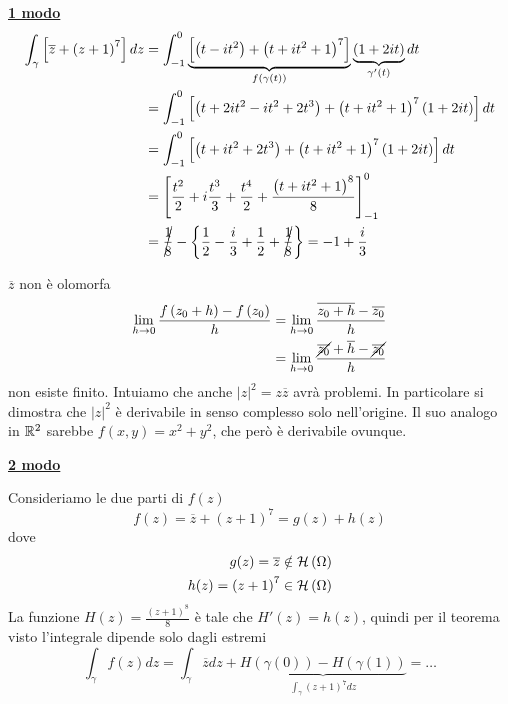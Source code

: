 \textbf{\underline{1 modo}}
\begin{align*}
\int\nolimits_{\gamma}\left[\overline{z} + \left(z + 1\right)^{7}\right] dz & = \int\nolimits^{0}_{- 1}\underbrace{\left[\left(t - it^{2}\right) + \left(t + it^{2} + 1\right)^{7}\right]}_{f\left(\gamma (t)\right)}\underbrace{\left(1 + 2it\right)}_{\gamma '(t)} dt\\
 & = \int\nolimits^{0}_{- 1}\left[\left(t + 2it^{2} - it^{2} + 2t^{3}\right) + \left(t + it^{2} + 1\right)^{7}\left(1 + 2it\right)\right] dt\\
 & = \int\nolimits^{0}_{- 1}\left[\left(t + it^{2} + 2t^{3}\right) + \left(t + it^{2} + 1\right)^{7}\left(1 + 2it\right)\right] dt\\
 & = \left[\frac{t^{2}}{2} + i\frac{t^{3}}{3} + \frac{t^{4}}{2} + \frac{\left(t + it^{2} + 1\right)^{8}}{8}\right]^{0}_{- 1}\\
 & = \cancel{\frac{1}{8}} - \left\{\frac{1}{2} - \frac{i}{3} + \frac{1}{2} + \cancel{\frac{1}{8}}\right\} = - 1 + \frac{i}{3}
\end{align*}
\begin{rem}
$\overline{z}$ non è olomorfa
\begin{align*}
\lim\limits_{h\rightarrow 0}\frac{f\left(z_{0} + h\right) - f\left(z_{0}\right)}{h} & = \lim\limits_{h\rightarrow 0}\frac{\overline{z_{0} + h} - \overline{z_{0}}}{h}\\
 & = \lim\limits_{h\rightarrow 0}\frac{\cancel{\overline{z_{0}}} + \overline{h} - \cancel{\overline{z_{0}}}}{h}
\end{align*}
non esiste finito. Intuiamo che anche $\left| z\right|^{2} = z\overline{z}$ avrà problemi. In particolare si dimostra che $\left| z\right|^{2}$ è derivabile in senso complesso solo nell'origine. Il suo analogo in $\mathbb{R}^{2}$ sarebbe $f\left(x, y\right) = x^{2} + y^{2}$, che però è derivabile ovunque.
\end{rem}
\textbf{\underline{2 modo}}

Consideriamo le due parti di $f(z)$
\begin{equation*}
f(z) = \overline{z} + \left(z + 1\right)^{7} = g(z) + h(z)
\end{equation*}
dove
\begin{equation*}
\begin{aligned}
g(z) = \overline{z} & \notin \mathcal{H} \left(\Omega \right)\\
h(z) = \left(z + 1\right)^{7} & \in \mathcal{H} \left(\Omega \right)
\end{aligned}
\end{equation*}
La funzione $H(z) = \frac{\left(z + 1\right)^{8}}{8}$ è tale che $H'(z) = h(z)$, quindi per il teorema visto l'integrale dipende solo dagli estremi
\begin{equation*}
\int\nolimits_{\gamma} f(z) dz = \int\nolimits_{\gamma}\overline{z} dz + \underbrace{H\left(\gamma (0)\right) - H\left(\gamma (1)\right)}_{\int\nolimits_{\gamma}\left(z + 1\right)^{7} dz} = \dotsc 
\end{equation*}
\Soluzione

